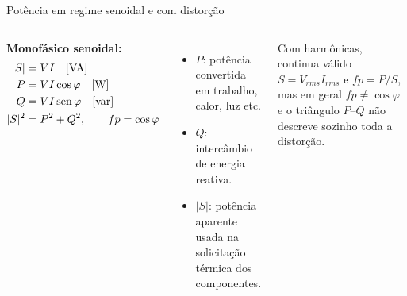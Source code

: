 \begin{frame}{Potência em regime senoidal e com distorção}
\small
\begin{columns}[T,onlytextwidth]
\textbf{Monofásico senoidal:}
\begin{align*}
|S| &= VI \quad [\si{VA}]\\
P &= VI\cos\varphi \quad [\si{W}]\\
Q &= VI\sen\varphi \quad [\si{var}]\\
|S|^2 &= P^2+Q^2,\qquad fp=\cos\varphi
\end{align*}
\begin{itemize}
\item $P$: potência convertida em trabalho, calor, luz etc.
\item $Q$: intercâmbio de energia reativa.
\item $|S|$: potência aparente usada na solicitação térmica dos componentes.
\end{itemize}
\centering
{}
\begin{caixaAt}
Com harmônicas, continua válido $S=V_{rms}I_{rms}$ e $fp=P/S$, mas em geral $fp\neq\cos\varphi$ e o triângulo $P$--$Q$ não descreve sozinho toda a distorção.
\end{caixaAt}
\end{columns}
\end{frame}

